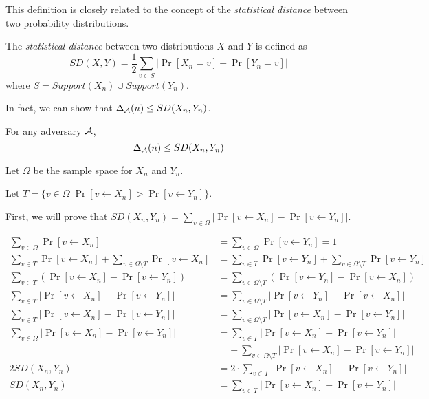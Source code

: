 This definition is closely related to the concept of the \textit{statistical distance} between two probability distributions.
\begin{definition}
The \emph{statistical distance} between two distributions $X$ and $Y$ is defined as
$$SD(X, Y) = \frac{1}{2}\sum\limits_{v \in S}|\Pr[X_n = v] - \Pr[Y_n = v]|$$
where $S = Support(X_n) \cup Support(Y_n)$.
\end{definition}
In fact, we can show that $\Delta_{\mathcal{A}}(n) \le SD(X_n, Y_n)$.
\begin{lemma}
    For any adversary $\mathcal{A}$,
    $$\Delta_{\mathcal{A}}(n) \le SD(X_n, Y_n)$$
\end{lemma}

\proof
Let $\Omega$ be the sample space for $X_n$ and $Y_n$.

Let $T = \{v \in \Omega | \Pr[v \leftarrow X_n] > \Pr[v \leftarrow Y_n]\}$.

First, we will prove that $SD(X_n, Y_n) = \sum\limits_{v \in \Omega} |\Pr[v \leftarrow X_n] - \Pr[v \leftarrow Y_n]|$.

\begin{align*}
    \sum\limits_{v \in \Omega} \Pr[v \leftarrow X_n] &= \sum\limits_{v \in \Omega} \Pr[v \leftarrow Y_n] = 1 \\
    \sum\limits_{v \in T}\Pr[v \leftarrow X_n] + \sum\limits_{v \in \Omega\setminus T}\Pr[v \leftarrow X_n] &= \sum\limits_{v \in T}\Pr[v \leftarrow Y_n] + \sum\limits_{v \in \Omega\setminus T}\Pr[v \leftarrow Y_n]\\
    \sum\limits_{v \in T}(\Pr[v \leftarrow X_n] - \Pr[v \leftarrow Y_n]) &= \sum\limits_{v \in \Omega \setminus T}(\Pr[v \leftarrow Y_n] - \Pr[v \leftarrow X_n])\\
    \sum\limits_{v \in T}|\Pr[v \leftarrow X_n] - \Pr[v \leftarrow Y_n]| &= \sum\limits_{v \in \Omega \setminus T}|\Pr[v \leftarrow Y_n] - \Pr[v \leftarrow X_n]|\\
    \sum\limits_{v \in T}|\Pr[v \leftarrow X_n] - \Pr[v \leftarrow Y_n]| &= \sum\limits_{v \in \Omega \setminus T}|\Pr[v \leftarrow X_n] - \Pr[v \leftarrow Y_n]|\\
    \sum\limits_{v \in \Omega}|\Pr[v \leftarrow X_n] - \Pr[v \leftarrow Y_n]| &= \sum\limits_{v \in T}|\Pr[v \leftarrow X_n] - \Pr[v \leftarrow Y_n]|\\
    &\;\;\;\; + \sum\limits_{v \in \Omega \setminus T}|\Pr[v \leftarrow X_n] - \Pr[v \leftarrow Y_n]|\\
    2SD(X_n, Y_n) &= 2 \cdot \sum\limits_{v \in T}|\Pr[v \leftarrow X_n] - \Pr[v \leftarrow Y_n]|\\
    SD(X_n, Y_n) &= \sum\limits_{v \in T}|\Pr[v \leftarrow X_n] - \Pr[v \leftarrow Y_n]|
\end{align*}

